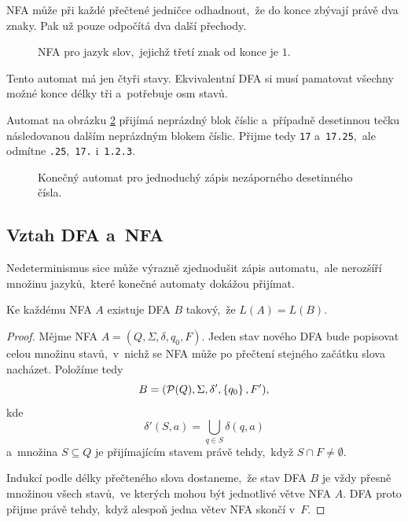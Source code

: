 \begin{example}\label{ex:nfa-treti-od-konce}
    NFA může při každé přečtené jedničce odhadnout,~že do konce zbývají právě dva znaky. Pak už pouze odpočítá dva další přechody.
    \begin{figure}[h]
        \centering
        
        \caption{NFA pro jazyk slov,~jejichž třetí znak od konce je $1$.}
        \label{fig:nfa-treti-od-konce}
    \end{figure}
    Tento automat má jen čtyři stavy. Ekvivalentní DFA si musí pamatovat všechny možné konce délky tři a~potřebuje osm stavů.
\end{example}

\begin{example}
    Automat na obrázku \ref{fig:automat-desetinne} přijímá neprázdný blok číslic a~případně desetinnou tečku následovanou dalším neprázdným blokem číslic. Přijme tedy \texttt{17} a~\texttt{17.25},~ale odmítne \texttt{.25},~\texttt{17.} i~\texttt{1.2.3}.
    \begin{figure}[h]
        \centering
        
        \caption{Konečný automat pro jednoduchý zápis nezáporného desetinného čísla.}
        \label{fig:automat-desetinne}
    \end{figure}
\end{example}

\subsection{Vztah DFA a~NFA}

Nedeterminismus sice může výrazně zjednodušit zápis automatu,~ale nerozšíří množinu jazyků,~které konečné automaty dokážou přijímat.

\begin{theorem}\label{thm:subset-construction}
    Ke každému NFA $A$ existuje DFA $B$ takový,~že $L(A)=L(B)$.
\end{theorem}
\begin{proof}
    Mějme NFA $A=(Q,\Sigma,\delta,q_0,F)$. Jeden stav nového DFA bude popisovat celou množinu stavů,~v~nichž se NFA může po přečtení stejného začátku slova nacházet. Položíme tedy
    \[B=(\mathcal{P}(Q),\Sigma,\delta',\left\{q_0\right\},F'),\]
    kde
    \[\delta'(S,a)=\bigcup_{q\in S}\delta(q,a)\]
    a~množina $S\subseteq Q$ je přijímajícím stavem právě tehdy,~když $S\cap F\neq\emptyset$.

    Indukcí podle délky přečteného slova dostaneme,~že stav DFA $B$ je vždy přesně množinou všech stavů,~ve kterých mohou být jednotlivé větve NFA $A$. DFA proto přijme právě tehdy,~když alespoň jedna větev NFA skončí v~$F$.
\end{proof}


